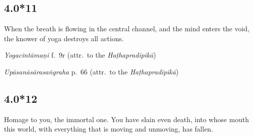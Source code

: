 \begin{ekdosis}
%

\subsection*{4.0*11}
\begin{translation}[hp04_000_11]
When the breath is flowing in the central channel, and the mind enters the void, the knower of yoga destroys all actions.
\end{translation}

\begin{sources}[hp04_000_11]
\end{sources}

\begin{testimonia}[hp04_000_11]
\emph{Yogacintāmaṇi} f.~9r (attr.~to the \emph{Haṭhapradīpikā})
\begin{versinnote}
\end{versinnote}

\emph{Upāsanāsārasaṅgraha} p.~66 (attr.~to the \emph{Haṭhapradīpikā})
\begin{versinnote}
\end{versinnote}
\end{testimonia}


\subsection*{4.0*12}
\begin{translation}[hp04_000_12]
Homage to you, the immortal one. You have slain even death, into whose mouth this world, with everything that is moving and unmoving, has fallen.
\end{translation}


\begin{sources}[hp04_000_12]
\end{sources}

\begin{testimonia}[hp04_000_12]
\end{testimonia}


\end{ekdosis}

